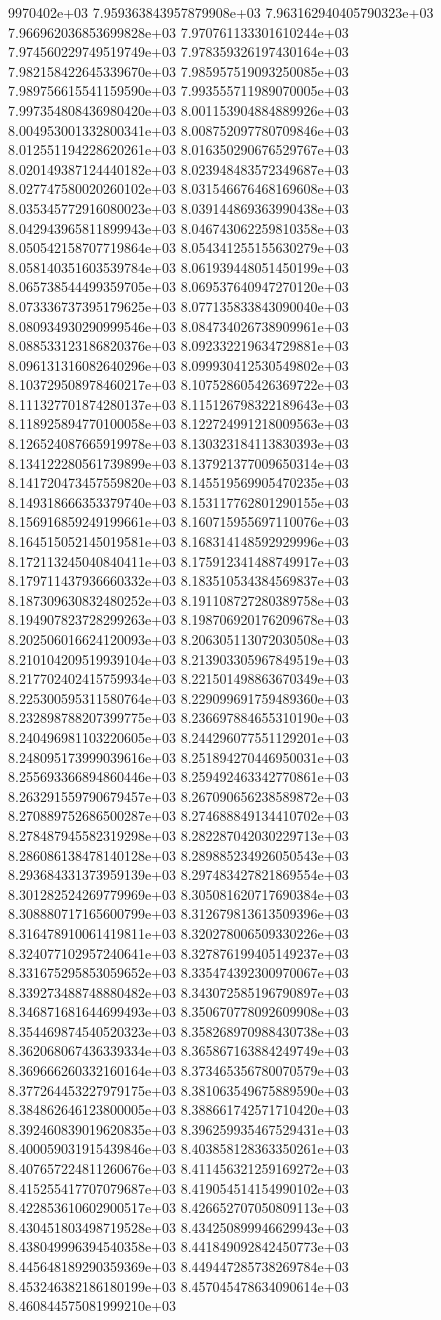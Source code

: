 9970402e+03	7.959363843957879908e+03	7.963162940405790323e+03	7.966962036853699828e+03	7.970761133301610244e+03	7.974560229749519749e+03	7.978359326197430164e+03	7.982158422645339670e+03	7.985957519093250085e+03	7.989756615541159590e+03	7.993555711989070005e+03	7.997354808436980420e+03	8.001153904884889926e+03	8.004953001332800341e+03	8.008752097780709846e+03	8.012551194228620261e+03	8.016350290676529767e+03	8.020149387124440182e+03	8.023948483572349687e+03	8.027747580020260102e+03	8.031546676468169608e+03	8.035345772916080023e+03	8.039144869363990438e+03	8.042943965811899943e+03	8.046743062259810358e+03	8.050542158707719864e+03	8.054341255155630279e+03	8.058140351603539784e+03	8.061939448051450199e+03	8.065738544499359705e+03	8.069537640947270120e+03	8.073336737395179625e+03	8.077135833843090040e+03	8.080934930290999546e+03	8.084734026738909961e+03	8.088533123186820376e+03	8.092332219634729881e+03	8.096131316082640296e+03	8.099930412530549802e+03	8.103729508978460217e+03	8.107528605426369722e+03	8.111327701874280137e+03	8.115126798322189643e+03	8.118925894770100058e+03	8.122724991218009563e+03	8.126524087665919978e+03	8.130323184113830393e+03	8.134122280561739899e+03	8.137921377009650314e+03	8.141720473457559820e+03	8.145519569905470235e+03	8.149318666353379740e+03	8.153117762801290155e+03	8.156916859249199661e+03	8.160715955697110076e+03	8.164515052145019581e+03	8.168314148592929996e+03	8.172113245040840411e+03	8.175912341488749917e+03	8.179711437936660332e+03	8.183510534384569837e+03	8.187309630832480252e+03	8.191108727280389758e+03	8.194907823728299263e+03	8.198706920176209678e+03	8.202506016624120093e+03	8.206305113072030508e+03	8.210104209519939104e+03	8.213903305967849519e+03	8.217702402415759934e+03	8.221501498863670349e+03	8.225300595311580764e+03	8.229099691759489360e+03	8.232898788207399775e+03	8.236697884655310190e+03	8.240496981103220605e+03	8.244296077551129201e+03	8.248095173999039616e+03	8.251894270446950031e+03	8.255693366894860446e+03	8.259492463342770861e+03	8.263291559790679457e+03	8.267090656238589872e+03	8.270889752686500287e+03	8.274688849134410702e+03	8.278487945582319298e+03	8.282287042030229713e+03	8.286086138478140128e+03	8.289885234926050543e+03	8.293684331373959139e+03	8.297483427821869554e+03	8.301282524269779969e+03	8.305081620717690384e+03	8.308880717165600799e+03	8.312679813613509396e+03	8.316478910061419811e+03	8.320278006509330226e+03	8.324077102957240641e+03	8.327876199405149237e+03	8.331675295853059652e+03	8.335474392300970067e+03	8.339273488748880482e+03	8.343072585196790897e+03	8.346871681644699493e+03	8.350670778092609908e+03	8.354469874540520323e+03	8.358268970988430738e+03	8.362068067436339334e+03	8.365867163884249749e+03	8.369666260332160164e+03	8.373465356780070579e+03	8.377264453227979175e+03	8.381063549675889590e+03	8.384862646123800005e+03	8.388661742571710420e+03	8.392460839019620835e+03	8.396259935467529431e+03	8.400059031915439846e+03	8.403858128363350261e+03	8.407657224811260676e+03	8.411456321259169272e+03	8.415255417707079687e+03	8.419054514154990102e+03	8.422853610602900517e+03	8.426652707050809113e+03	8.430451803498719528e+03	8.434250899946629943e+03	8.438049996394540358e+03	8.441849092842450773e+03	8.445648189290359369e+03	8.449447285738269784e+03	8.453246382186180199e+03	8.457045478634090614e+03	8.460844575081999210e+03